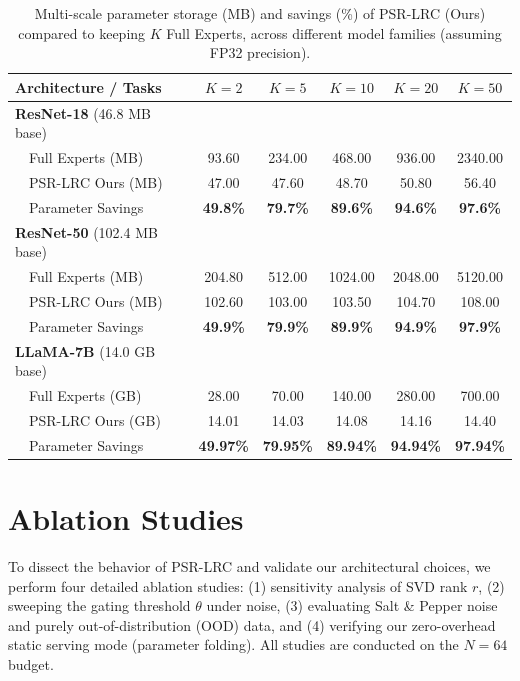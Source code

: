 \documentclass{article}
\theoremstyle{plain}
\theoremstyle{definition}
\theoremstyle{remark}
\begin{document}
\begin{table}[t]
\caption{Multi-scale parameter storage (MB) and savings (\%) of PSR-LRC (Ours) compared to keeping $K$ Full Experts, across different model families (assuming FP32 precision).}
\label{tab:scaling_analysis}
\vskip 0.05in
\begin{center}
\begin{small}
\begin{sc}
\begin{tabular}{lccccc}
\toprule
Architecture / Tasks & $K=2$ & $K=5$ & $K=10$ & $K=20$ & $K=50$ \\
\midrule
\textbf{ResNet-18} (46.8 MB base) & \\
\ \ Full Experts (MB) & 93.60 & 234.00 & 468.00 & 936.00 & 2340.00 \\
\ \ PSR-LRC Ours (MB) & 47.00 & 47.60 & 48.70 & 50.80 & 56.40 \\
\ \ Parameter Savings & \textbf{49.8\%} & \textbf{79.7\%} & \textbf{89.6\%} & \textbf{94.6\%} & \textbf{97.6\%} \\
\midrule
\textbf{ResNet-50} (102.4 MB base) & \\
\ \ Full Experts (MB) & 204.80 & 512.00 & 1024.00 & 2048.00 & 5120.00 \\
\ \ PSR-LRC Ours (MB) & 102.60 & 103.00 & 103.50 & 104.70 & 108.00 \\
\ \ Parameter Savings & \textbf{49.9\%} & \textbf{79.9\%} & \textbf{89.9\%} & \textbf{94.9\%} & \textbf{97.9\%} \\
\midrule
\textbf{LLaMA-7B} (14.0 GB base) & \\
\ \ Full Experts (GB) & 28.00 & 70.00 & 140.00 & 280.00 & 700.00 \\
\ \ PSR-LRC Ours (GB) & 14.01 & 14.03 & 14.08 & 14.16 & 14.40 \\
\ \ Parameter Savings & \textbf{49.97\%} & \textbf{79.95\%} & \textbf{89.94\%} & \textbf{94.94\%} & \textbf{97.94\%} \\
\bottomrule
\end{tabular}
\end{sc}
\end{small}
\end{center}
\vskip -0.1in
\end{table}

\section{Ablation Studies}
\label{sec:ablations}
To dissect the behavior of PSR-LRC and validate our architectural choices, we perform four detailed ablation studies: (1) sensitivity analysis of SVD rank $r$, (2) sweeping the gating threshold $\theta$ under noise, (3) evaluating Salt \& Pepper noise and purely out-of-distribution (OOD) data, and (4) verifying our zero-overhead static serving mode (parameter folding). All studies are conducted on the $N=64$ budget.
\end{document}
